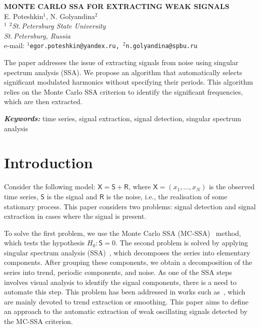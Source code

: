 \documentclass[12pt]{article}
\providecommand{\keywords}[1]
{
\vspace{2mm}\hspace{20pt}\textbf{\textit{Keywords:}} #1
}
\providecommand{\abskeyw}[2]
{
\begin{small}
\begin{adjustwidth}{10mm}{10mm}
\vspace{1mm}\hspace{20pt}#1

\keywords{#2}
\end{adjustwidth}
\end{small}
}
\begin{document}
\begin{center}
{\Large\bf MONTE CARLO SSA FOR EXTRACTING WEAK SIGNALS}\\\vspace{2mm} {\sc E. Poteshkin$^1$, N. Golyandina$^2$}\\\vspace{2mm}
{\it $^{1}$ $^{2}$St.\,Petersburg State University\\
St.\,Petersburg, Russia\\} e-mail: {\tt $^1$egor.poteshkin@yandex.ru,
$^2$n.golyandina@spbu.ru}

\abskeyw{The paper addresses the issue of extracting signals from noise using singular spectrum analysis (SSA). We propose an algorithm that automatically selects significant modulated harmonics without specifying their periods. This algorithm relies on the Monte Carlo SSA criterion to identify the significant frequencies, which are then extracted.}{time series, signal extraction, signal detection, singular spectrum analysis}
\end{center}

\section{Introduction}

Consider the following model: $\mathsf{X}=\mathsf{S}+\mathsf{R}$, where $\mathsf{X} = (x_1,\ldots,x_N)$ is the observed time series, $\mathsf{S}$ is the signal and $\mathsf{R}$ is the noise, i.e., the realisation of some stationary process. This paper considers two problems: signal detection and signal extraction in cases where the signal is present.

To solve the first problem, we use the Monte Carlo SSA (MC-SSA)~\cite{AllenSmith96} method, which tests the hypothesis $H_0:\mathsf{S}=0$. The second problem is solved by applying singular spectrum analysis (SSA)~\cite{Broomhead1986, ssa2001}, which decomposes the series into elementary components. After grouping these components, we obtain a decomposition of the series into trend, periodic components, and noise. As one of the SSA steps involves visual analysis to identify the signal components, there is a need to automate this step. This problem has been addressed in works such as~\cite{alexandrov, Kalantari2019, circSSA, autoSSA}, which are mainly devoted to trend extraction or smoothing. This paper aims to define an approach to the automatic extraction of weak oscillating signals detected by the MC-SSA criterion.
\end{document}
